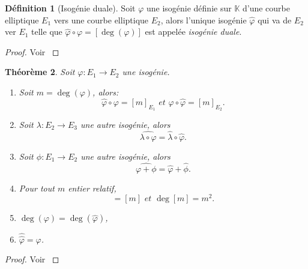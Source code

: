 \documentclass[10pt,a4paper]{book}
\theoremstyle{plain}
\newtheorem{thm}{Théorème}
\theoremstyle{definition}
\theoremstyle{definition}
\theoremstyle{definition}
\theoremstyle{definition}
\newtheorem{defi}[thm]{Définition}
\theoremstyle{remark}
\theoremstyle{remark}
\begin{document}
\begin{defi}[Isogénie duale]
Soit $\varphi$ une isogénie définie sur $\mathbb{K}$ d'une courbe elliptique $E_1$ vers une courbe elliptique $E_2$, alors l'unique isogénie $\widehat{\varphi}$ qui va de $E_2$ ver $E_1$ telle que $\widehat{\varphi}\circ\varphi=[\deg(\varphi)]$ est appelée \emph{isogénie duale}.
\end{defi}

\begin{proof}
Voir \cite[III.6.1]{Silv1}
\end{proof}

\begin{thm}
Soit $\varphi:E_1 \rightarrow E_2$ une isogénie.
\begin{enumerate}
\item Soit $m=\deg(\varphi)$, alors:
\begin{equation*}
\widehat{\varphi}\circ \varphi=[m]_{E_1} \textit{ et }  \varphi \circ \widehat{\varphi}=[m]_{E_2}.
\end{equation*}
\item Soit $\lambda:E_2 \rightarrow E_3$ une autre isogénie, alors
\begin{equation*}
\widehat{\lambda \circ \varphi}=\widehat{\lambda} \circ \widehat{\varphi}.
\end{equation*} 
\item Soit $\phi:E_1 \rightarrow E_2$ une autre isogénie, alors
\begin{equation*}
\widehat{\varphi+\phi}=\widehat{\varphi}+\widehat{\phi}.
\end{equation*}
\item Pour tout $m$ entier relatif,
\begin{equation*}
[\widehat{m}]=[m] \textit{ et } \deg[m]=m^2.
\end{equation*}
\item $\deg( \varphi)=\deg(\widehat{\varphi})$,
\item $\widehat{\widehat{\varphi}}=\varphi$.
\end{enumerate}
 
\end{thm}

\begin{proof}
Voir \cite[Theorem III.6.2]{Silv1}
\end{proof}
\end{document}
